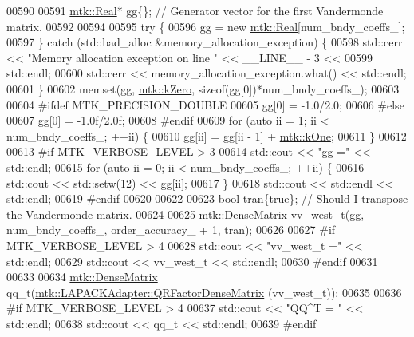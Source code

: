 \begin{DoxyCode}
{{00590 
00591   \hyperlink{group__c01-roots_gac080bbbf5cbb5502c9f00405f894857d}{mtk::Real}* gg\{\}; \textcolor{comment}{// Generator vector for the first Vandermonde matrix.}
00592 
00594 
00595   \textcolor{keywordflow}{try} \{
00596     gg = \textcolor{keyword}{new} \hyperlink{group__c01-roots_gac080bbbf5cbb5502c9f00405f894857d}{mtk::Real}[num\_bndy\_coeffs\_];
00597   \} \textcolor{keywordflow}{catch} (std::bad\_alloc &memory\_allocation\_exception) \{
00598     std::cerr << \textcolor{stringliteral}{"Memory allocation exception on line "} << \_\_LINE\_\_ - 3 <<
00599       std::endl;
00600     std::cerr << memory\_allocation\_exception.what() << std::endl;
00601   \}
00602   memset(gg, \hyperlink{group__c01-roots_ga59a451a5fae30d59649bcda274fea271}{mtk::kZero}, \textcolor{keyword}{sizeof}(gg[0])*num\_bndy\_coeffs\_);
00603 
00604 \textcolor{preprocessor}{  #ifdef MTK\_PRECISION\_DOUBLE}
00605   gg[0] = -1.0/2.0;
00606 \textcolor{preprocessor}{  #else}
00607   gg[0] = -1.0f/2.0f;
00608 \textcolor{preprocessor}{  #endif}
00609   \textcolor{keywordflow}{for} (\textcolor{keyword}{auto} ii = 1; ii < num\_bndy\_coeffs\_; ++ii) \{
00610     gg[ii] = gg[ii - 1] + \hyperlink{group__c01-roots_ga26407c24d43b6b95480943340d285c71}{mtk::kOne};
00611   \}
00612 
00613 \textcolor{preprocessor}{  #if MTK\_VERBOSE\_LEVEL > 3}
00614   std::cout << \textcolor{stringliteral}{"gg ="} << std::endl;
00615   \textcolor{keywordflow}{for} (\textcolor{keyword}{auto} ii = 0; ii < num\_bndy\_coeffs\_; ++ii) \{
00616     std::cout << std::setw(12) << gg[ii];
00617   \}
00618   std::cout << std::endl << std::endl;
00619 \textcolor{preprocessor}{  #endif}
00620 
00622 
00623   \textcolor{keywordtype}{bool} tran\{\textcolor{keyword}{true}\}; \textcolor{comment}{// Should I transpose the Vandermonde matrix.}
00624 
00625   \hyperlink{classmtk_1_1DenseMatrix}{mtk::DenseMatrix} vv\_west\_t(gg, num\_bndy\_coeffs\_, order\_accuracy\_ + 1, tran);
00626 
00627 \textcolor{preprocessor}{  #if MTK\_VERBOSE\_LEVEL > 4}
00628   std::cout << \textcolor{stringliteral}{"vv\_west\_t ="} << std::endl;
00629   std::cout << vv\_west\_t << std::endl;
00630 \textcolor{preprocessor}{  #endif}
00631 
00633 
00634   \hyperlink{classmtk_1_1DenseMatrix}{mtk::DenseMatrix} qq\_t(\hyperlink{classmtk_1_1LAPACKAdapter_ae5c6e78c9c819c9ac7a6f31bfd011d7a}{mtk::LAPACKAdapter::QRFactorDenseMatrix}
      (vv\_west\_t));
00635 
00636 \textcolor{preprocessor}{  #if MTK\_VERBOSE\_LEVEL > 4}
00637   std::cout << \textcolor{stringliteral}{"QQ^T = "} << std::endl;
00638   std::cout << qq\_t << std::endl;
00639 \textcolor{preprocessor}{  #endif}
}}
\end{DoxyCode}
